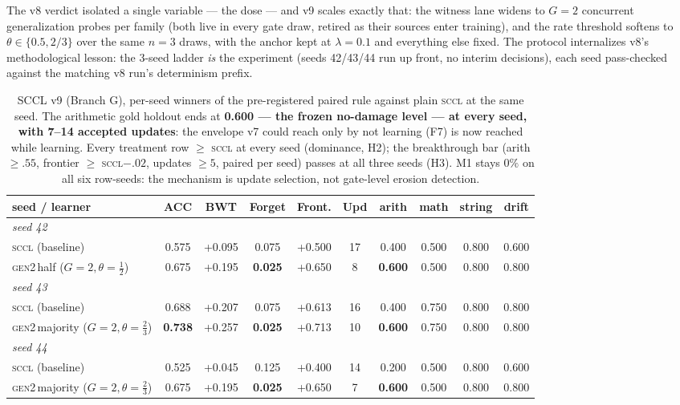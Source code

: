 \documentclass[10pt,conference]{IEEEtran}
\begin{document}
The v8 verdict isolated a single variable --- the dose --- and v9 scales exactly that: the witness lane widens to $G{=}2$ concurrent generalization probes per family (both live in every gate draw, retired as their sources enter training), and the rate threshold softens to $\theta\in\{0.5, 2/3\}$ over the same $n{=}3$ draws, with the anchor kept at $\lambda{=}0.1$ and everything else fixed. The protocol internalizes v8's methodological lesson: the 3-seed ladder \emph{is} the experiment (seeds 42/43/44 run up front, no interim decisions), each seed pass-checked against the matching v8 run's determinism prefix.

\begin{table}[t]
\centering
\small
\caption{SCCL v9 (Branch G), per-seed winners of the pre-registered paired rule against plain \textsc{sccl} at the same seed. The arithmetic gold holdout ends at \textbf{0.600 --- the frozen no-damage level --- at every seed, with 7--14 accepted updates}: the envelope v7 could reach only by not learning (F7) is now reached while learning. Every treatment row $\geq$ \textsc{sccl} at every seed (dominance, H2); the breakthrough bar (arith $\geq.55$, frontier $\geq$ \textsc{sccl}${-}.02$, updates $\geq5$, paired per seed) passes at all three seeds (H3). M1 stays $0\%$ on all six row-seeds: the mechanism is update selection, not gate-level erosion detection.}
\label{tab:v9}
\begin{tabular}{lccccccccc}
\toprule
seed / learner & ACC & BWT & Forget & Front. & Upd & arith & math & string & drift \\
\midrule
\multicolumn{10}{l}{\emph{seed 42}} \\
\textsc{sccl} (baseline)     & 0.575 & +0.095 & 0.075 & +0.500 & 17 & 0.400 & 0.500 & 0.800 & 0.600 \\
\textsc{gen2}\,half ($G{=}2,\theta{=}\tfrac12$) & 0.675 & +0.195 & \textbf{0.025} & +0.650 & 8 & \textbf{0.600} & 0.500 & 0.800 & 0.800 \\
\midrule
\multicolumn{10}{l}{\emph{seed 43}} \\
\textsc{sccl} (baseline)     & 0.688 & +0.207 & 0.075 & +0.613 & 16 & 0.400 & 0.750 & 0.800 & 0.800 \\
\textsc{gen2}\,majority ($G{=}2,\theta{=}\tfrac23$) & \textbf{0.738} & +0.257 & \textbf{0.025} & +0.713 & 10 & \textbf{0.600} & 0.750 & 0.800 & 0.800 \\
\midrule
\multicolumn{10}{l}{\emph{seed 44}} \\
\textsc{sccl} (baseline)     & 0.525 & +0.045 & 0.125 & +0.400 & 14 & 0.200 & 0.500 & 0.800 & 0.600 \\
\textsc{gen2}\,majority ($G{=}2,\theta{=}\tfrac23$) & 0.675 & +0.195 & \textbf{0.025} & +0.650 & 7 & \textbf{0.600} & 0.500 & 0.800 & 0.800 \\
\bottomrule
\end{tabular}
\end{table}
\end{document}
